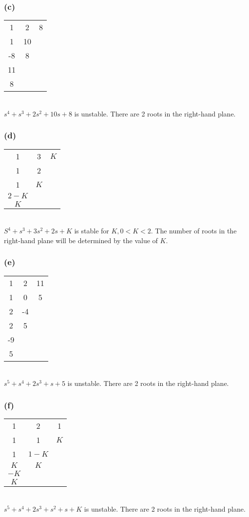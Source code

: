 \documentclass[letterpaper,10pt]{article}
\begin{document}
\subsubsection*{(c)}
\begin{tabular}{ccc}
	1&2&8\\
	1&10&\\
	-8&8&\\
	11&&\\
	8&&
\end{tabular}\\
$s^4+s^3+2s^2+10s+8$ is unstable.  There are 2 roots in the right-hand plane.
\subsubsection*{(d)}
\begin{tabular}{ccc}
	1&3&$K$\\
	1&2&\\
	1&$K$&\\
	$2-K$&&\\
	$K$&&
\end{tabular}\\
$S^4+s^3+3s^2+2s+K$ is stable for $K, 0<K<2$.  The number of roots in the right-hand plane will be determined by the value of $K$.
\subsubsection*{(e)}
\begin{tabular}{ccc}
	1&2&11\\
	1&0&5\\
	2&-4&\\
	2&5&\\
	-9&&\\
	5&&
\end{tabular}\\
$s^5+s^4+2s^3+s+5$ is unstable.  There are 2 roots in the right-hand plane.
\subsubsection*{(f)}
\begin{tabular}{ccc}
	1&2&1\\
	1&1&$K$\\
	1&$1-K$&\\
	$K$&$K$&\\
	$-K$&&\\
	$K$&&
\end{tabular}\\
$s^5+s^4+2s^3+s^2+s+K$ is unstable.  There are 2 roots in the right-hand plane.
\end{document}
